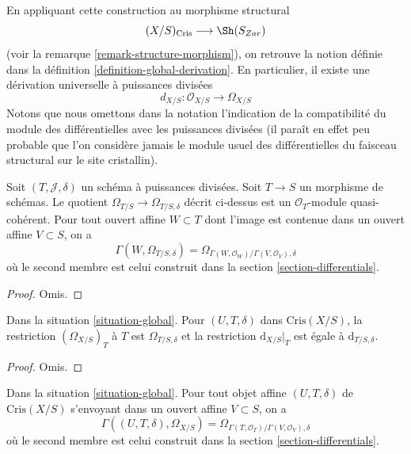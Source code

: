\medskip\noindent
En appliquant cette construction au morphisme structural
$$
(X/S)_{\text{Cris}} \longrightarrow \Sh(S_{Zar})
$$
(voir la remarque \ref{remark-structure-morphism}), on retrouve la notion
définie dans la définition \ref{definition-global-derivation}.
En particulier, il existe une dérivation universelle à puissances divisées
$$
d_{X/S} : \mathcal{O}_{X/S} \to \Omega_{X/S}
$$
Notons que nous omettons dans la notation l'indication de la compatibilité du
module des différentielles avec les puissances divisées (il paraît en effet
peu probable que l'on considère jamais le module usuel des différentielles du
faisceau structural sur le site cristallin).

\begin{lemma}
\label{lemma-module-differentials-divided-power-scheme}
Soit $(T, \mathcal{J}, \delta)$ un schéma à puissances divisées.
Soit $T \to S$ un morphisme de schémas.
Le quotient $\Omega_{T/S} \to \Omega_{T/S, \delta}$
décrit ci-dessus est un $\mathcal{O}_T$-module quasi-cohérent.
Pour tout ouvert affine $W \subset T$ dont l'image est contenue dans un
ouvert affine $V \subset S$, on a
$$
\Gamma(W, \Omega_{T/S, \delta}) =
\Omega_{\Gamma(W, \mathcal{O}_W)/\Gamma(V, \mathcal{O}_V), \delta}
$$
où le second membre est
celui construit dans la section \ref{section-differentials}.
\end{lemma}

\begin{proof}
Omis.
\end{proof}

\begin{lemma}
\label{lemma-module-of-differentials}
Dans la situation \ref{situation-global}.
Pour $(U, T, \delta)$ dans $\text{Cris}(X/S)$, la restriction
$(\Omega_{X/S})_T$ à $T$ est $\Omega_{T/S, \delta}$ et la restriction
$\text{d}_{X/S}|_T$ est égale à $\text{d}_{T/S, \delta}$.
\end{lemma}

\begin{proof}
Omis.
\end{proof}

\begin{lemma}
\label{lemma-module-of-differentials-on-affine}
Dans la situation \ref{situation-global}.
Pour tout objet affine $(U, T, \delta)$ de $\text{Cris}(X/S)$
s'envoyant dans un ouvert affine $V \subset S$, on a
$$
\Gamma((U, T, \delta), \Omega_{X/S}) =
\Omega_{\Gamma(T, \mathcal{O}_T)/\Gamma(V, \mathcal{O}_V), \delta}
$$
où le second membre est
celui construit dans la section \ref{section-differentials}.
\end{lemma}

